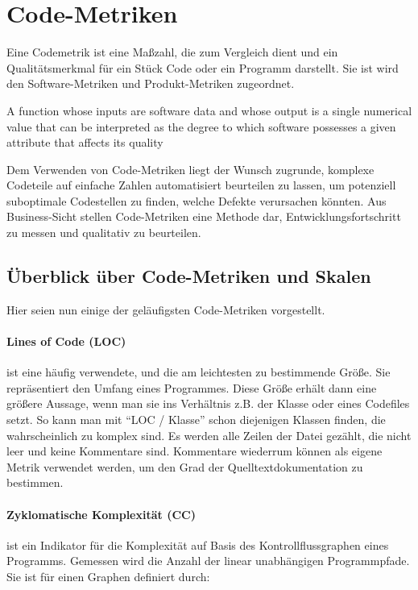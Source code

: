 \section{Code-Metriken}
Eine Codemetrik ist eine Maßzahl, die zum Vergleich dient und ein Qualitätsmerkmal für ein Stück Code oder ein Programm darstellt. Sie ist wird den Software-Metriken und Produkt-Metriken zugeordnet.

\epigraph{A function whose inputs are software data and whose output is a single
numerical value that can be interpreted as the degree to which software possesses a given attribute that affects its quality}{\cite{ieee_1998}}

Dem Verwenden von Code-Metriken liegt der Wunsch zugrunde, komplexe Codeteile auf einfache Zahlen automatisiert beurteilen zu lassen, um potenziell suboptimale Codestellen zu finden, welche Defekte verursachen könnten. Aus Business-Sicht stellen Code-Metriken eine Methode dar, Entwicklungsfortschritt zu messen und qualitativ zu beurteilen.
\subsection{Überblick über Code-Metriken und Skalen}
Hier seien nun einige der geläufigsten Code-Metriken vorgestellt.
\paragraph{Lines of Code (LOC)} ist eine häufig verwendete, und die am leichtesten zu bestimmende Größe. Sie repräsentiert den Umfang eines Programmes. Diese Größe erhält dann eine größere Aussage, wenn man sie ins Verhältnis z.B. der Klasse oder eines Codefiles setzt. So kann man mit "`LOC / Klasse"' schon diejenigen Klassen finden, die wahrscheinlich zu komplex sind. Es werden alle Zeilen der Datei gezählt, die nicht leer und keine Kommentare sind. Kommentare wiederrum können als eigene Metrik verwendet werden, um den Grad der Quelltextdokumentation zu bestimmen.

\paragraph{Zyklomatische Komplexität (CC)} ist ein Indikator für die Komplexität auf Basis des Kontrollflussgraphen eines Programms. Gemessen wird die Anzahl der linear unabhängigen Programmpfade. Sie ist für einen Graphen definiert durch:


